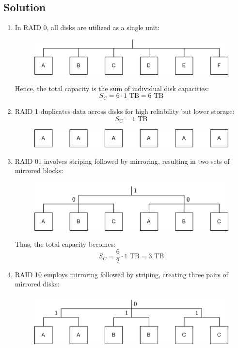 \subsection*{Solution}
\begin{enumerate}
    \item In RAID 0, all disks are utilized as a single unit:
        \begin{figure}[H]
            \centering
            \includegraphics[width=0.7\linewidth]{images/raid0.png}
        \end{figure}
        Hence, the total capacity is the sum of individual disk capacities:
        \[S_C=6\cdot1\text{ TB}=6\text{ TB}\]
    \item RAID 1 duplicates data across disks for high reliability but lower storage:
        \[S_C=1\text{ TB}\]
        \begin{figure}[H]
            \centering
            \includegraphics[width=0.7\linewidth]{images/raid1.png}
        \end{figure}
    \item RAID 01 involves striping followed by mirroring, resulting in two sets of mirrored blocks:
        \begin{figure}[H]
            \centering
            \includegraphics[width=0.7\linewidth]{images/raid01.png}
        \end{figure}
        Thus, the total capacity becomes:
        \[S_C=\dfrac{6}{2}\cdot 1\text{ TB}=3\text{ TB}\]
    \item RAID 10 employs mirroring followed by striping, creating three pairs of mirrored disks:
        \begin{figure}[H]
            \centering
            \includegraphics[width=0.7\linewidth]{images/raid10.png}

\end{figure}
\end{enumerate}
